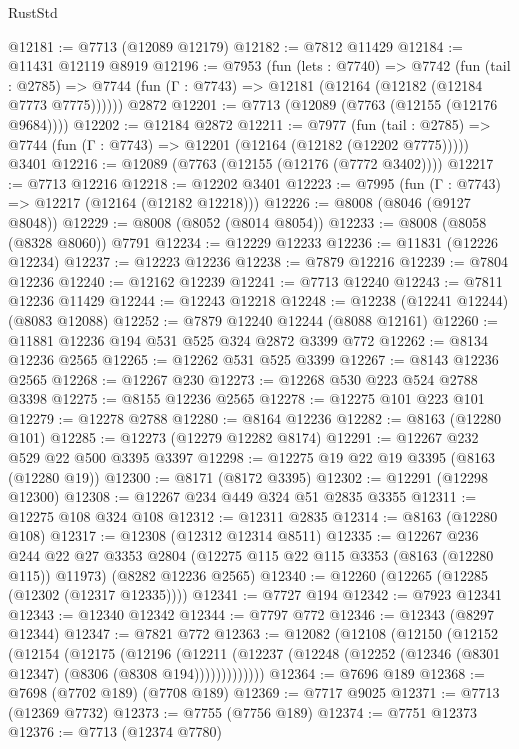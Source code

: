 \begin{lexlean}{RustStd}
\begin{coremodule}
@12181 := @7713 (@12089 @12179)
@12182 := @7812 @11429
@12184 := @11431 @12119 @8919
@12196 := @7953
    (fun (lets : @7740) =>
    @7742
      (fun (tail : @2785) =>
      @7744 (fun (Γ : @7743) => @12181 (@12164 (@12182 (@12184 @7773 @7775))))))
    @2872
@12201 := @7713 (@12089 (@7763 (@12155 (@12176 @9684))))
@12202 := @12184 @2872
@12211 := @7977
    (fun (tail : @2785) => @7744 (fun (Γ : @7743) => @12201 (@12164 (@12182 (@12202 @7775)))))
    @3401
@12216 := @12089 (@7763 (@12155 (@12176 (@7772 @3402))))
@12217 := @7713 @12216
@12218 := @12202 @3401
@12223 := @7995 (fun (Γ : @7743) => @12217 (@12164 (@12182 @12218)))
@12226 := @8008 (@8046 (@9127 @8048))
@12229 := @8008 (@8052 (@8014 @8054))
@12233 := @8008 (@8058 (@8328 @8060)) @7791
@12234 := @12229 @12233
@12236 := @11831 (@12226 @12234)
@12237 := @12223 @12236
@12238 := @7879 @12216
@12239 := @7804 @12236
@12240 := @12162 @12239
@12241 := @7713 @12240
@12243 := @7811 @12236 @11429
@12244 := @12243 @12218
@12248 := @12238 (@12241 @12244) (@8083 @12088)
@12252 := @7879 @12240 @12244 (@8088 @12161)
@12260 := @11881 @12236 @194 @531 @525 @324 @2872 @3399 @772
@12262 := @8134 @12236 @2565
@12265 := @12262 @531 @525 @3399
@12267 := @8143 @12236 @2565
@12268 := @12267 @230
@12273 := @12268 @530 @223 @524 @2788 @3398
@12275 := @8155 @12236 @2565
@12278 := @12275 @101 @223 @101
@12279 := @12278 @2788
@12280 := @8164 @12236
@12282 := @8163 (@12280 @101)
@12285 := @12273 (@12279 @12282 @8174)
@12291 := @12267 @232 @529 @22 @500 @3395 @3397
@12298 := @12275 @19 @22 @19 @3395 (@8163 (@12280 @19))
@12300 := @8171 (@8172 @3395)
@12302 := @12291 (@12298 @12300)
@12308 := @12267 @234 @449 @324 @51 @2835 @3355
@12311 := @12275 @108 @324 @108
@12312 := @12311 @2835
@12314 := @8163 (@12280 @108)
@12317 := @12308 (@12312 @12314 @8511)
@12335 := @12267
    @236
    @244
    @22
    @27
    @3353
    @2804
    (@12275 @115 @22 @115 @3353 (@8163 (@12280 @115)) @11973)
    (@8282 @12236 @2565)
@12340 := @12260 (@12265 (@12285 (@12302 (@12317 @12335))))
@12341 := @7727 @194
@12342 := @7923 @12341
@12343 := @12340 @12342
@12344 := @7797 @772
@12346 := @12343 (@8297 @12344)
@12347 := @7821 @772
@12363 := @12082
    (@12108
      (@12150
        (@12152
          (@12154
            (@12175
              (@12196
                (@12211
                  (@12237 (@12248 (@12252 (@12346 (@8301 @12347) (@8306 (@8308 @194)))))))))))))
@12364 := @7696 @189
@12368 := @7698 (@7702 @189) (@7708 @189)
@12369 := @7717 @9025
@12371 := @7713 (@12369 @7732)
@12373 := @7755 (@7756 @189)
@12374 := @7751 @12373
@12376 := @7713 (@12374 @7780)

\end{coremodule}
\end{lexlean}
